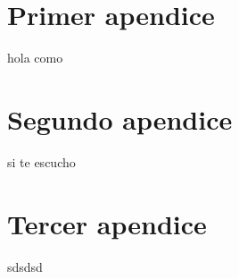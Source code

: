 
\appendix
\chapter{Primer apendice}
hola como
\chapter{Segundo apendice}
si te escucho
\chapter{Tercer apendice}
sdsdsd

